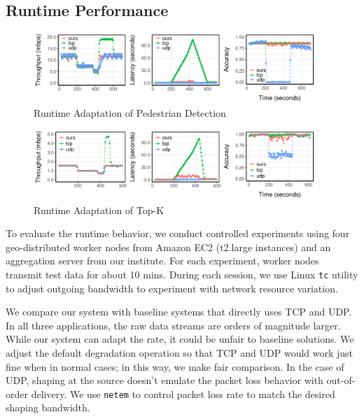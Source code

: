 \subsection{Runtime Performance}
\label{sec:runtime-performance}

\begin{figure}
  \centering
  \includegraphics[width=0.95\textwidth]{figures/ped-runtime-horizontal.pdf}
  \caption{Runtime Adaptation of Pedestrian Detection}
  \label{fig:ped-runtime}
\end{figure}

\begin{figure}
  \centering
  \includegraphics[width=0.95\textwidth]{figures/cdn-runtime-horizontal.pdf}
  \caption{Runtime Adaptation of Top-K}
  \label{fig:ped-runtime}
\end{figure}

To evaluate the runtime behavior, we conduct controlled experiments using four
geo-distributed worker nodes from Amazon EC2 (t2.large instances) and an
aggregation server from our institute. For each experiment, worker nodes
transmit test data for about 10 mins. During each session, we use Linux
\texttt{tc} utility to adjust outgoing bandwidth to experiment with network
resource variation.

We compare our system with baseline systems that directly uses TCP and UDP. In
all three applications, the raw data streams are orders of magnitude
larger. While our system can adapt the rate, it could be unfair to baseline
solutions. We adjust the default degradation operation so that TCP and UDP would
work just fine when in normal cases; in this way, we make fair comparison. In
the case of UDP, shaping at the source doesn't emulate the packet loss behavior
with out-of-order delivery. We use \texttt{netem} to control packet loss rate to
match the desired shaping bandwidth.

